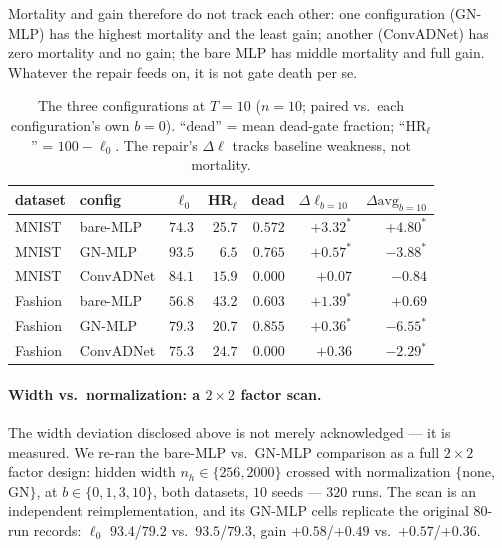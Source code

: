 \documentclass[review,12pt,number]{elsarticle}
\begin{document}
Mortality and gain therefore do not track each other: one configuration
(GN-MLP) has the highest mortality and the least gain; another
(ConvADNet) has zero mortality and no gain; the bare MLP has middle
mortality and full gain. Whatever the repair feeds on, it is not gate
death per se.

\begin{table}[t]
\centering\small
\caption{The three configurations at $T{=}10$ ($n{=}10$; paired
vs.\ each configuration's own $b{=}0$). ``dead'' = mean dead-gate
fraction; ``HR$_\ell$'' = $100 - \ell_0$. The repair's
$\Delta\ell$ tracks baseline weakness, not mortality.}
\label{tab:three}
\begin{tabular}{llrrrrr}
\toprule
dataset & config & $\ell_0$ & HR$_\ell$ & dead &
$\Delta\ell_{b=10}$ & $\Delta\mathrm{avg}_{b=10}$ \\
\midrule
MNIST & bare-MLP & $74.3$ & $25.7$ & $0.572$ &
$+3.32^{*}$ & $+4.80^{*}$ \\
MNIST & GN-MLP & $93.5$ & $6.5$ & $\mathbf{0.765}$ &
$+0.57^{*}$ & $-3.88^{*}$ \\
MNIST & ConvADNet & $84.1$ & $15.9$ & $\mathbf{0.000}$ &
$+0.07$ & $-0.84$ \\
\midrule
Fashion & bare-MLP & $56.8$ & $43.2$ & $0.603$ &
$+1.39^{*}$ & $+0.69$ \\
Fashion & GN-MLP & $79.3$ & $20.7$ & $\mathbf{0.855}$ &
$+0.36^{*}$ & $-6.55^{*}$ \\
Fashion & ConvADNet & $75.3$ & $24.7$ & $\mathbf{0.000}$ &
$+0.36$ & $-2.29^{*}$ \\
\bottomrule
\end{tabular}
\end{table}

\paragraph{Width vs.\ normalization: a $2{\times}2$ factor scan.}
The width deviation disclosed above is not merely acknowledged --- it
is measured. We re-ran the bare-MLP vs.\ GN-MLP comparison as a full
$2{\times}2$ factor design: hidden width $n_h \in \{256, 2000\}$
crossed with normalization $\{$none, $\mathrm{GN}\}$, at $b \in
\{0,1,3,10\}$, both datasets, $10$ seeds --- $320$ runs. The scan is
an independent reimplementation, and its GN-MLP cells replicate the
original $80$-run records: $\ell_0$ $93.4$/$79.2$ vs.\
$93.5$/$79.3$, gain $+0.58$/$+0.49$ vs.\ $+0.57$/$+0.36$.
\end{document}
